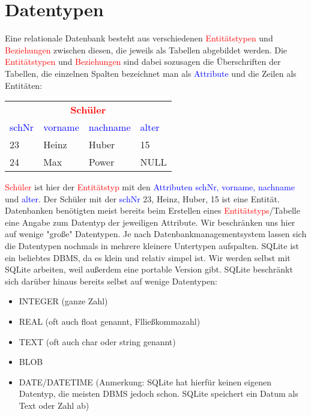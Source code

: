 \section{Datentypen}
Eine relationale Datenbank besteht aus verschiedenen \textcolor{red}{Entitätstypen} und \textcolor{red}{Beziehungen} zwischen diesen, die jeweils als Tabellen abgebildet werden. Die \textcolor{red}{Entitätstypen} und \textcolor{red}{Beziehungen} sind dabei sozusagen die Überschriften der Tabellen, die einzelnen Spalten bezeichnet man als \textcolor{blue}{Attribute} und die Zeilen als Entitäten:\\
\begin{table}[h]
	\centering
	\begin{tabular}{llll}
		\multicolumn{4}{c}{\textcolor{red}{\textbf{Schüler}}}\\
		\textcolor{blue}{schNr} 	& \textcolor{blue}{vorname} 	& \textcolor{blue}{nachname}	& \textcolor{blue}{alter}  \\
		\midrule
		23&Heinz&Huber&15\\
		24&Max&Power&NULL\\
	\end{tabular}
\end{table}
\textcolor{red}{Schüler} ist hier der \textcolor{red}{Entitätstyp} mit den \textcolor{blue}{Attributen schNr, vorname, nachname} und \textcolor{blue}{alter}. Der Schüler mit der \textcolor{blue}{schNr} 23, Heinz, Huber, 15 ist eine Entität.
Datenbanken benötigten meist bereits beim Erstellen eines \textcolor{red}{Entitätstyps}/Tabelle eine Angabe zum Datentyp der jeweiligen Attribute. Wir beschränken uns hier auf wenige "große" Datentypen. Je nach Datenbankmanagementsystem lassen sich die Datentypen nochmals in mehrere kleinere Untertypen aufspalten.
SQLite ist ein beliebtes DBMS, da es klein und relativ simpel ist. Wir werden selbst mit SQLite arbeiten, weil außerdem eine portable Version gibt. SQLite beschränkt sich darüber hinaus bereits selbst auf wenige Datentypen:
\begin{tcolorbox}[title=Datentypen]
	\begin{itemize}
		\item INTEGER (ganze Zahl)
		\item REAL (oft auch float genannt, Flließkommazahl)
		\item TEXT (oft auch char oder string genannt)
		\item BLOB
		\item DATE/DATETIME (Anmerkung: SQLite hat hierfür keinen eigenen Datentyp, die meisten DBMS jedoch schon. SQLite speichert ein Datum als Text oder Zahl ab)
	\end{itemize}
\end{tcolorbox}


